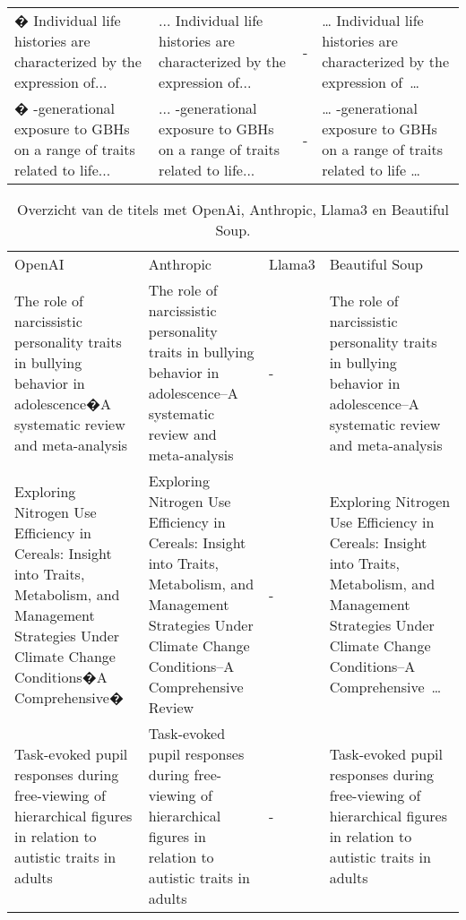 \begin{table}[h!]
\begin{sideways}
\begin{tabularx}{\textwidth}{|X|X|p{1cm}|X|}
        � Individual life histories are characterized by the expression of... & ... Individual life histories are characterized by the expression of... & - & … Individual life histories are characterized by the expression of …\\
        � -generational exposure to GBHs on a range of traits related to life... & ... -generational exposure to GBHs on a range of traits related to life... & - & … -generational exposure to GBHs on a range of traits related to life …\\
        \hline
    \end{tabularx}
\end{sideways}
    \label{table:llmTekst}
\end{table}
\begin{table}[h!]
    \tiny
    \caption{Overzicht van de titels met OpenAi, Anthropic, Llama3 en Beautiful Soup.}
    \centering
    \begin{sideways}
    \begin{tabularx}{\textwidth}{|X|X|p{1cm}|X|} 
        \hline
        \rowcolor{lightgray}
        \multicolumn{4}{|X|}{Titel}\\ 
        \hline
        \rowcolor{lightgray}
        OpenAI & Anthropic & Llama3 & Beautiful Soup \\ 
        \hline
        The role of narcissistic personality traits in bullying behavior in adolescence�A systematic review and meta-analysis & The role of narcissistic personality traits in bullying behavior in adolescence–A systematic review and meta-analysis & - & The role of narcissistic personality traits in bullying behavior in adolescence–A systematic review and meta-analysis\\ 
        Exploring Nitrogen Use Efficiency in Cereals: Insight into Traits, Metabolism, and Management Strategies Under Climate Change Conditions�A Comprehensive� & Exploring Nitrogen Use Efficiency in Cereals: Insight into Traits, Metabolism, and Management Strategies Under Climate Change Conditions–A Comprehensive Review & - & Exploring Nitrogen Use Efficiency in Cereals: Insight into Traits, Metabolism, and Management Strategies Under Climate Change Conditions–A Comprehensive …\\
        Task-evoked pupil responses during free-viewing of hierarchical figures in relation to autistic traits in adults & Task-evoked pupil responses during free-viewing of hierarchical figures in relation to autistic traits in adults & - & Task-evoked pupil responses during free-viewing of hierarchical figures in relation to autistic traits in adults\\

\end{tabularx}
\end{sideways}
\end{table}
